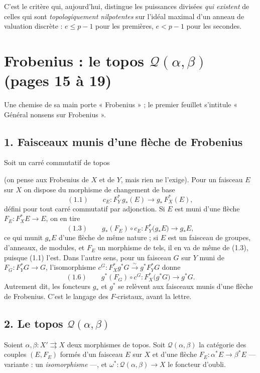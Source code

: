 \documentclass[11pt,a4paper]{article}
\begin{document}
C'est le critère qui, aujourd'hui, distingue les puissances divisées
\emph{qui existent} de celles qui sont \emph{topologiquement nilpotentes} sur
l'idéal maximal d'un anneau de valuation discrète : $e \leqslant p-1$ pour
les premières, $e < p-1$ pour les secondes.

\section*{Frobenius : le topos $\mathcal{Q}(\alpha, \beta)$ (pages 15 à 19)}

Une chemise de sa main porte « Frobenius » ; le premier feuillet s'intitule
« Général nonsens sur Frobenius ».

\subsection*{1. Faisceaux munis d'une flèche de Frobenius}

Soit un carré commutatif de topos
(on pense aux Frobenius de $X$ et de $Y$, mais rien ne l'exige). Pour un
faisceau $E$ sur $X$ on dispose du morphisme de changement de base
\[
(1.1) \qquad c_E : F_Y^{*}\, g_*(E) \longrightarrow g_*\, F_X^{*}(E),
\]
défini pour tout carré commutatif par adjonction. Si $E$ est muni d'une
flèche $F_E : F_X^{*}E \to E$, on en tire
\[
(1.3) \qquad g_*(F_E) \circ c_E : F_Y^{*}\bigl(g_*E\bigr) \longrightarrow
g_*E ,
\]
ce qui munit $g_*E$ d'une flèche de même nature ; si $E$ est un faisceau de
groupes, d'anneaux, de modules, et $F_E$ un morphisme de tels, il en va de
même de (1.3), puisque (1.1) l'est. Dans l'autre sens, pour un faisceau $G$
sur $Y$ muni de $F_G : F_Y^{*}G \to G$, l'isomorphisme
$c^{G} : F_X^{*}g^{*}G \xrightarrow{\sim} g^{*}F_Y^{*}G$ donne
\[
(1.6) \qquad g^{*}(F_G) \circ c^{G} : F_X^{*}\bigl(g^{*}G\bigr)
\longrightarrow g^{*}G .
\]
Autrement dit, les foncteurs $g_*$ et $g^{*}$ se relèvent aux faisceaux
munis d'une flèche de Frobenius. C'est le langage des $F$-cristaux, avant
la lettre.

\subsection*{2. Le topos $\mathcal{Q}(\alpha, \beta)$}

Soient $\alpha, \beta : X' \rightrightarrows X$ deux morphismes de topos. Soit
$\mathcal{Q}(\alpha, \beta)$ la catégorie des couples $(E, F_E)$ formés d'un
faisceau $E$ sur $X$ et d'une flèche $F_E : \alpha^{*}E \to \beta^{*}E$
— variante : un \emph{isomorphisme} —, et
$\omega^{*} : \mathcal{Q}(\alpha,\beta) \to X$ le foncteur d'oubli.
\end{document}
